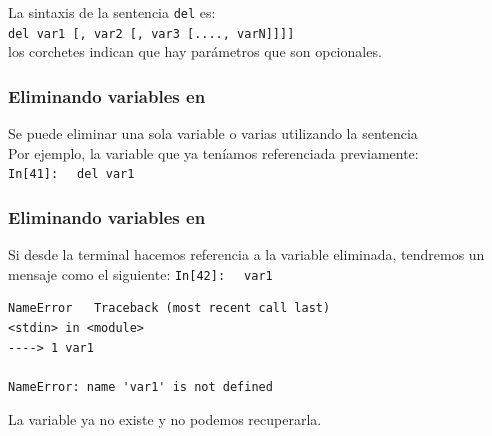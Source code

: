 {\begin{frame}
La sintaxis de la sentencia \texttt{del} es:
\\
\bigskip
\texttt{del var1 [, var2 [, var3 [...., varN]]]]}
\\
\bigskip
los corchetes indican que hay parámetros que son opcionales.
\end{frame}
\begin{frame}[fragile]
\frametitle{Eliminando variables en \python}
Se puede eliminar una sola variable o varias utilizando la sentencia 
\\
\bigskip
Por ejemplo, la variable  que ya teníamos referenciada previamente:
\\
\bigskip
\textcolor{ao}{\texttt{In[41]: }} \verb| del var1|
\end{frame}
\begin{frame}[fragile]
\frametitle{Eliminando variables en }
Si desde la terminal hacemos referencia a la variable eliminada, tendremos un mensaje como el siguiente:
\textcolor{ao}{\texttt{In[42]: }} \verb| var1|
\begin{verbatim}
NameError   Traceback (most recent call last)
<stdin> in <module>
----> 1 var1

NameError: name 'var1' is not defined
\end{verbatim}
La variable ya no existe y no podemos recuperarla.
\end{frame}
}
